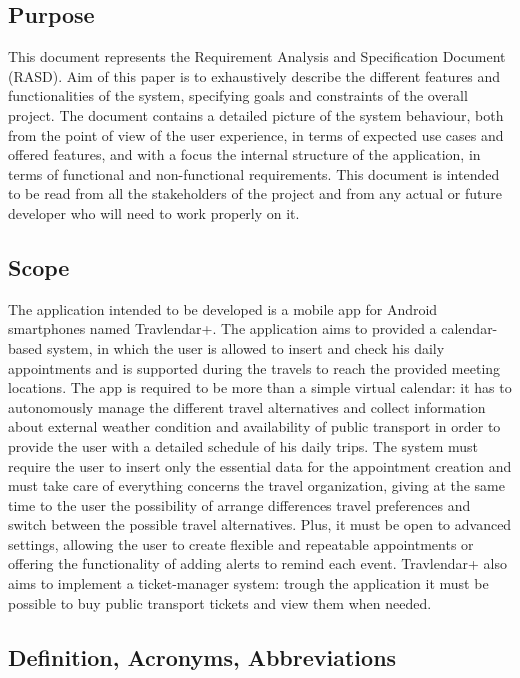 \subsection{Purpose}
This document represents the Requirement Analysis and Specification Document (RASD). Aim of this paper is to exhaustively describe the different features and functionalities of the system, specifying goals and constraints of the overall project. The document contains a detailed picture of the system behaviour, both from the point of view of the user experience, in terms of expected use cases and offered features, and with a focus the internal structure of the application, in terms of functional and non-functional requirements.
This document is intended to be read from all the stakeholders of the project and from any actual or future developer who will need to work properly on it.

\subsection{Scope}
The application intended to be developed is a mobile app for Android smartphones named Travlendar+. The application aims to provided a calendar-based system, in which the user is allowed to insert and check his daily appointments and is supported during the travels to reach the provided meeting locations.
The app is required to be more than a simple virtual calendar: it has to autonomously manage the different travel alternatives and collect information about external weather condition and availability of public transport in order to provide the user with a detailed schedule of his daily trips. The system must require the user to insert only the essential data for the appointment creation and must take care of everything concerns the travel organization, giving at the same time to the user the possibility of arrange differences travel preferences and switch between the possible travel alternatives. Plus, it must be open to advanced settings, allowing the user to create flexible and repeatable appointments or offering the functionality of adding alerts to remind each event. 
Travlendar+ also aims to implement a ticket-manager system: trough the application it must be possible to buy public transport tickets and view them when needed.

\subsection{Definition, Acronyms, Abbreviations}
